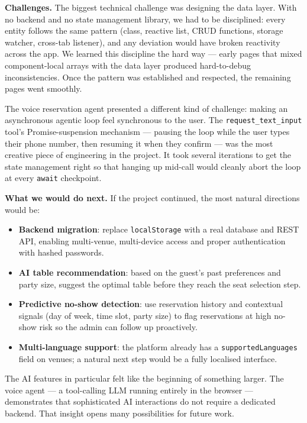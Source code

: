 \documentclass[12pt,a4paper,oneside]{report}
\begin{document}
\textbf{Challenges.}
The biggest technical challenge was designing the data layer. With no backend
and no state management library, we had to be disciplined: every entity
follows the same pattern (class, reactive list, CRUD functions, storage
watcher, cross-tab listener), and any deviation would have broken reactivity
across the app. We learned this discipline the hard way --- early pages that
mixed component-local arrays with the data layer produced hard-to-debug
inconsistencies. Once the pattern was established and respected, the
remaining pages went smoothly.

The voice reservation agent presented a different kind of challenge: making
an asynchronous agentic loop feel synchronous to the user. The
\texttt{request\_text\_input} tool's Promise-suspension mechanism --- pausing
the loop while the user types their phone number, then resuming it when they
confirm --- was the most creative piece of engineering in the project. It
took several iterations to get the state management right so that hanging up
mid-call would cleanly abort the loop at every \texttt{await} checkpoint.

\textbf{What we would do next.}
If the project continued, the most natural directions would be:

\begin{itemize}[leftmargin=1.5em, topsep=4pt, itemsep=3pt]
  \item \textbf{Backend migration}: replace \texttt{localStorage} with a
        real database and REST API, enabling multi-venue, multi-device access
        and proper authentication with hashed passwords.
  \item \textbf{AI table recommendation}: based on the guest's past
        preferences and party size, suggest the optimal table before they
        reach the seat selection step.
  \item \textbf{Predictive no-show detection}: use reservation history
        and contextual signals (day of week, time slot, party size) to flag
        reservations at high no-show risk so the admin can follow up
        proactively.
  \item \textbf{Multi-language support}: the platform already has a
        \texttt{supportedLanguages} field on venues; a natural next step
        would be a fully localised interface.
\end{itemize}

The AI features in particular felt like the beginning of something larger.
The voice agent --- a tool-calling LLM running entirely in the browser ---
demonstrates that sophisticated AI interactions do not require a dedicated
backend. That insight opens many possibilities for future work.
\end{document}
